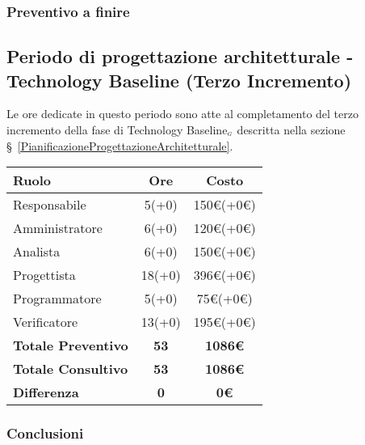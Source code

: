 {{{{{\subsubsection{Preventivo a finire}

\subsection{Periodo di progettazione architetturale - Technology Baseline (Terzo Incremento)}\label{ConsuntivoPeriodoDiProgettazioneArchitetturaleTechnologyBaselineTerzoIncremento}

Le ore dedicate in questo periodo sono atte al completamento del terzo incremento della fase di Technology Baseline$_{\scaleto{G}{3pt}}$ descritta nella sezione \S~\ref{PianificazioneProgettazioneArchitetturale}.

\quad
\def\tabularxcolumn#1{m{#1}}
{
	\begin{center}
		\renewcommand{\arraystretch}{1.4}
		\begin{tabularx}{10cm}{|X|c|c|}
			\hline
			\rowcolor{airforceblue}
			\textbf{Ruolo} & \textbf{Ore} & \textbf{Costo}\\
			\hline
			Responsabile & 5(+0) & 150\euro(+0\euro)\\
			\hline
			Amministratore & 6(+0) & 120\euro(+0\euro)\\
			\hline
			Analista & 6(+0) & 150\euro(+0\euro)\\
			\hline
			Progettista & 18(+0) & 396\euro(+0\euro)\\
			\hline
			Programmatore & 5(+0) & 75\euro(+0\euro)\\
			\hline
			Verificatore & 13(+0) & 195\euro(+0\euro)\\
			\hline
			\textbf{Totale Preventivo} & \textbf{53} & \textbf{1086\euro}\\
			\hline
			\textbf{Totale Consultivo} & \textbf{53} & \textbf{1086\euro}\\
			\hline
			\textbf{Differenza} & \textbf{0} & \textbf{0\euro}
		\end{tabularx}
	\end{center}

\subsubsection{Conclusioni}

}}}}}}
